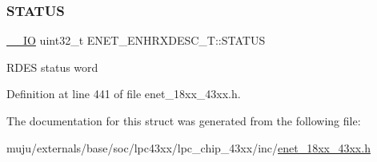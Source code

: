 \mbox{\label{struct_e_n_e_t___e_n_h_r_x_d_e_s_c___t_a9f7ff354fc8c16564c13eb5674fc0725}} 
\subsubsection{\texorpdfstring{S\+T\+A\+T\+US}{STATUS}}
{\footnotesize\ttfamily \hyperlink{core__sc300_8h_aec43007d9998a0a0e01faede4133d6be}{\+\_\+\+\_\+\+IO} uint32\+\_\+t E\+N\+E\+T\+\_\+\+E\+N\+H\+R\+X\+D\+E\+S\+C\+\_\+\+T\+::\+S\+T\+A\+T\+US}

R\+D\+ES status word 

Definition at line 441 of file enet\+\_\+18xx\+\_\+43xx.\+h.



The documentation for this struct was generated from the following file\+:\begin{DoxyCompactItemize}
\item 
muju/externals/base/soc/lpc43xx/lpc\+\_\+chip\+\_\+43xx/inc/\hyperlink{enet__18xx__43xx_8h}{enet\+\_\+18xx\+\_\+43xx.\+h}\end{DoxyCompactItemize}
